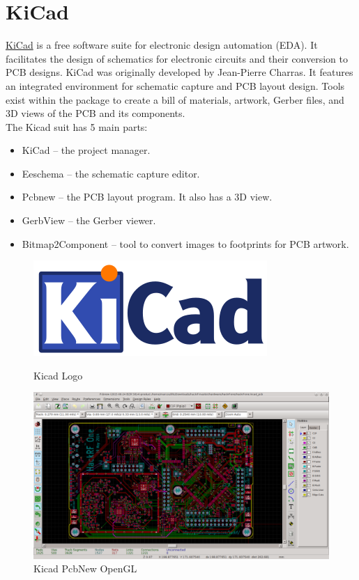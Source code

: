 \documentclass[12pt,a4paper]{report}
\begin{document}
\section{KiCad}
\href{http://kicad-pcb.org/}{KiCad} is a free software suite for electronic design automation (EDA). It facilitates the design of schematics for electronic circuits and their conversion to PCB designs. KiCad was originally developed by Jean-Pierre Charras. It features an integrated environment for schematic capture and PCB layout design. Tools exist within the package to create a bill of materials, artwork, Gerber files, and 3D views of the PCB and its components.
\\
The Kicad suit has 5 main parts: 
\begin{itemize}
	\itemsep0em 
	\item KiCad – the project manager.
	\item Eeschema – the schematic capture editor.
	\item Pcbnew – the PCB layout program. It also has a 3D view.
	\item GerbView – the Gerber viewer.
	\item Bitmap2Component – tool to convert images to footprints for PCB artwork.
\end{itemize}

\begin{figure}[h]
	\centering
	\includegraphics[scale=0.3]{KiCad-Logo}
	\caption{Kicad Logo}
	\vspace{5mm}
	\includegraphics[width=\textwidth]{KiCad}
	\caption{Kicad PcbNew OpenGL}
\end{figure}
\vspace{5mm}
\end{document}

